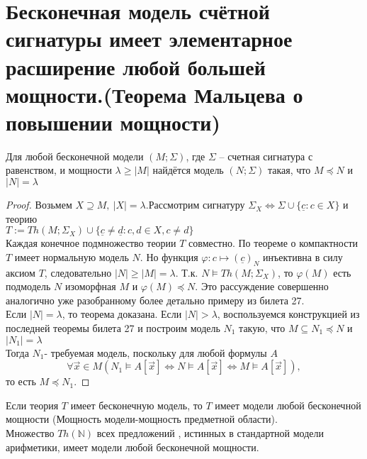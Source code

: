 \section{Бесконечная модель счётной сигнатуры имеет элементарное расширение
любой большей мощности.(Теорема Мальцева о повышении мощности)}
\begin{theorem} 
	Для любой бесконечной модели $(M ;\Sigma)$, где $\Sigma$ -- счетная сигнатура с равенством, и мощности $\lambda
	\ge |M|$ найдётся модель $(N ;\Sigma)$ такая, что $M \preccurlyeq N$ и $|N|=\lambda$
\end{theorem}
\begin{proof}
	Возьмем $ X \supseteq M,\:|X|=\lambda$.Рассмотрим сигнатуру $\Sigma_X \Longleftrightarrow \Sigma
	\cup\{\underline{c}: c \in X\}$ и теорию \\ $T:=Th\left(M ; \Sigma_{X}\right) \cup\{\underline{c} \neq
	\underline{d}: c, d \in X, c \neq d\}$\\
	Каждая конечное подмножество теории $T$ совместно. По теореме о компактности $T$ имеет нормальную модель $N$.
	Но функция $\varphi\colon c \mapsto(\underline{c})_{N}$ инъективна в силу аксиом $T$, следовательно $|N|\ge
	|M|=\lambda$. Т.к. $N\vDash Th(M;\Sigma_X)$, то $\varphi(M)$ есть подмодель $N$ изоморфная $M$ и $\varphi(M)
	\preccurlyeq N$. Это рассуждение совершенно аналогично уже разобранному более детально примеру из билета 27.\\
	Если $|N|=\lambda$, то теорема доказана. Если $|N|>\lambda$, воспользуемся конструкцией из последней теоремы
	билета 27 и построим модель $N_1$ такую, что $M \subseteq N_{1} \preccurlyeq N$ и
	$\left|N_{1}\right|=\lambda$\\
	Тогда $N_1$- требуемая модель, поскольку для любой формулы $A$\\
	$$\forall \vec{x} \in M\left(N_{1} \vDash A[\vec{x}] \Longleftrightarrow N \vDash A[\vec{x}]
	\Longleftrightarrow M \vDash A[\vec{x}]\right),$$ то есть $M \preccurlyeq N_1$.
\end{proof}
\begin{corollary}
	Если теория $T$ имеет бесконечную модель, то $T$ имеет модели любой бесконечной мощности (Мощность
	модели-мощность предметной области).\\ 
	Множество $Th(\mathbb{N})$ всех предложений , истинных в стандартной модели арифметики, имеет модели любой
	бесконечной мощности.
\end{corollary}
